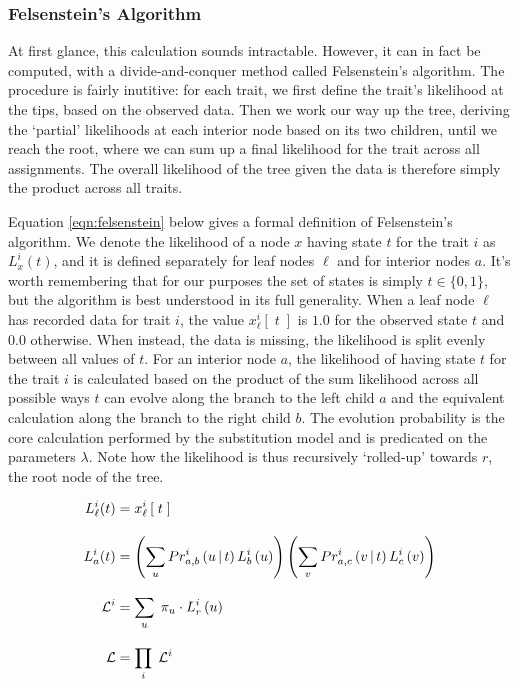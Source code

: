 \documentclass[10pt,journal,compsoc]{IEEEtran}
\begin{document}
\subsubsection{Felsenstein's Algorithm}

At first glance, this calculation sounds intractable. However, it can in fact be computed, with a divide-and-conquer method called Felsenstein's algorithm. The procedure is fairly inutitive: for each trait, we first define the trait's likelihood at the tips, based on the observed data. Then we work our way up the tree, deriving the `partial' likelihoods at each interior node based on its two children, until we reach the root, where we can sum up a final likelihood for the trait across all assignments. The overall likelihood of the tree given the data is therefore simply the product across all traits.\cite{felsenstein2004inferring}

Equation \eqref{eqn:felsenstein} below gives a formal definition of Felsenstein's algorithm. We denote the likelihood of a node $x$ having state $t$ for the trait $i$ as $L_x^{i}(t)$, and it is defined separately for leaf nodes $\ell$ and for interior nodes $a$. It's worth remembering that for our purposes the set of states is simply $t \in \{0, 1\}$, but the algorithm is best understood in its full generality. When a leaf node $\ell$ has recorded data for trait $i$, the value $x_\ell^{i}\left[\;t\;\right]$ is $1.0$ for the observed state $t$ and $0.0$ otherwise. When instead, the data is missing, the likelihood is split evenly between all values of $t$. For an interior node $a$, the likelihood of having state $t$ for the trait $i$ is calculated based on the product of the sum likelihood across all possible ways $t$ can evolve along the branch to the left child $a$ and the equivalent calculation along the branch to the right child $b$. The evolution probability is the core calculation performed by the substitution model and is predicated on the parameters $\lambda$. Note how the likelihood is thus recursively `rolled-up' towards $r$, the root node of the tree.

\begin{equation}\label{eqn:felsenstein}
    \setlength{\jot}{12px}
    \begin{split}
        L_\ell^{i}(t) &= x_\ell^{i}\left[\;t\;\right] \\
        L_a^{i}(t) &= \left(\sum_uPr^i_{a,b}\left(u\,\vert\,t\right)L_b^{i}\left(u\right)\right)\left(\sum_vPr^i_{a,c}\left(v\,\vert\,t\right)L_c^{i}\left(v\right)\right) \\
        \mathcal{L}^{i} &= \sum_u \;\pi_u \cdot L_r^{i}\left(u\right) \\
        \mathcal{L} &= \prod_i \;\mathcal{L}^i
    \end{split}
\end{equation}
\end{document}
